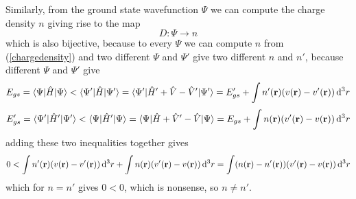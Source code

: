 Similarly, from the ground state wavefunction $\Psi$ we can compute the charge density $n$ giving rise to the map 
\begin{equation*}
  D: \Psi \to n
\end{equation*}
which is also bijective, because to every $\Psi$ we can compute $n$ from (\ref{chargedensity}) and two different $\Psi$ and $\Psi'$ give two different $n$ and $n'$, because different $\Psi$ and $\Psi'$ give 
\begin{equation*}
  E_{gs}=\mathinner{\langle{\Psi|\hat H|\Psi}\rangle}<\mathinner{\langle{\Psi'|\hat H|\Psi'}\rangle}= \mathinner{\langle{\Psi'|\hat H'+\hat V-\hat V'|\Psi'}\rangle}=E_{gs}'+\int n'({\bf r}) (v({\bf r})-v'({\bf r}))\,{\rm d}^3 r
\end{equation*}
\begin{equation*}
  E_{gs}'=\mathinner{\langle{\Psi'|\hat H'|\Psi'}\rangle}<\mathinner{\langle{\Psi|\hat H'|\Psi}\rangle}= \mathinner{\langle{\Psi|\hat H+\hat V'-\hat V|\Psi}\rangle}=E_{gs}+\int n({\bf r}) (v'({\bf r})-v({\bf r}))\,{\rm d}^3 r
\end{equation*}
adding these two inequalities together gives 
\begin{equation*}
  0<\int n'({\bf r}) (v({\bf r})-v'({\bf r}))\,{\rm d}^3 r + \int n({\bf r}) (v'({\bf r})-v({\bf r}))\,{\rm d}^3 r= \int (n({\bf r})-n'({\bf r}))(v'({\bf r})-v({\bf r}))\,{\rm d}^3 r
\end{equation*}
which for $n=n'$ gives $0<0$, which is nonsense, so $n\neq n'$.

